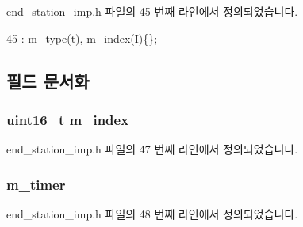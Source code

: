 end\+\_\+station\+\_\+imp.\+h 파일의 45 번째 라인에서 정의되었습니다.


\begin{DoxyCode}
45 : \hyperlink{classavdecc__lib_1_1background__read__request_ac20aab1609ec880fd9d4020e7dd26b5d}{m\_type}(t), \hyperlink{classavdecc__lib_1_1background__read__request_a52bd40c8f62ca529f15cf10ad3242965}{m\_index}(I)\{\};
\end{DoxyCode}


\subsection{필드 문서화}
\subsubsection[{\texorpdfstring{m\+\_\+index}{m_index}}]{\setlength{\rightskip}{0pt plus 5cm}uint16\+\_\+t m\+\_\+index}\hypertarget{classavdecc__lib_1_1background__read__request_a52bd40c8f62ca529f15cf10ad3242965}{}\label{classavdecc__lib_1_1background__read__request_a52bd40c8f62ca529f15cf10ad3242965}


end\+\_\+station\+\_\+imp.\+h 파일의 47 번째 라인에서 정의되었습니다.

\subsubsection[{\texorpdfstring{m\+\_\+timer}{m_timer}}]{ m\+\_\+timer}\hypertarget{classavdecc__lib_1_1background__read__request_a5daa6618e77c4857fad08488955edbd1}{}\label{classavdecc__lib_1_1background__read__request_a5daa6618e77c4857fad08488955edbd1}


end\+\_\+station\+\_\+imp.\+h 파일의 48 번째 라인에서 정의되었습니다.

